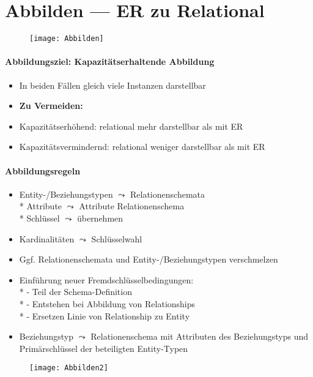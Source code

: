 \section{Abbilden --- ER zu Relational}
\label{sec:abbilden}

\begin{figure}[H]\centering\label{Abbilden}\texttt{[image: Abbilden]}\end{figure}

\paragraph{Abbildungsziel: Kapazitätserhaltende Abbildung}
\begin{itemize}
	\item In beiden Fällen gleich viele Instanzen darstellbar
	\item \textbf{Zu Vermeiden:}
	\item Kapazitätserhöhend: relational mehr darstellbar als mit ER
	\item Kapazitätsvermindernd: relational weniger darstellbar als mit ER
\end{itemize}

\paragraph{Abbildungsregeln}
\begin{itemize}
	\item Entity-/Beziehungstypen \( \leadsto \) Relationenschemata \\* Attribute \( \leadsto \) Attribute Relationenschema \\* Schlüssel \( \leadsto \) übernehmen
	\item Kardinalitäten \( \leadsto \) Schlüsselwahl
	\item Ggf. Relationenschemata und Entity-/Beziehungstypen verschmelzen
	\item Einführung neuer Fremdschlüsselbedingungen: \\*
		- Teil der Schema-Definition \\*
		- Entstehen bei Abbildung von Relationships \\*
		- Ersetzen Linie von Relationship zu Entity
	\item Beziehungstyp \( \leadsto \) Relationenschema mit Attributen des Beziehungstyps und Primärschlüssel der beteiligten Entity-Typen
\end{itemize}
\begin{figure}[H]\centering\label{Abbilden2}\texttt{[image: Abbilden2]}\end{figure}

